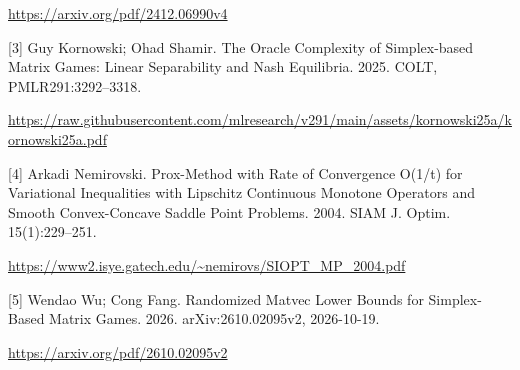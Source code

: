 \documentclass[10pt,a4paper]{article}
\begin{document}
\url{https://arxiv.org/pdf/2412.06990v4}



[3] Guy Kornowski; Ohad Shamir. The Oracle Complexity of Simplex-based Matrix Games: Linear Separability and Nash Equilibria. 2025. COLT, PMLR291:3292--3318.



\url{https://raw.githubusercontent.com/mlresearch/v291/main/assets/kornowski25a/kornowski25a.pdf}



[4] Arkadi Nemirovski. Prox-Method with Rate of Convergence O(1/t) for Variational Inequalities with Lipschitz Continuous Monotone Operators and Smooth Convex-Concave Saddle Point Problems. 2004. SIAM J. Optim. 15(1):229--251.



\url{https://www2.isye.gatech.edu/~nemirovs/SIOPT_MP_2004.pdf}



[5] Wendao Wu; Cong Fang. Randomized Matvec Lower Bounds for Simplex-Based Matrix Games. 2026. arXiv:2610.02095v2, 2026-10-19.



\url{https://arxiv.org/pdf/2610.02095v2}
\end{document}
